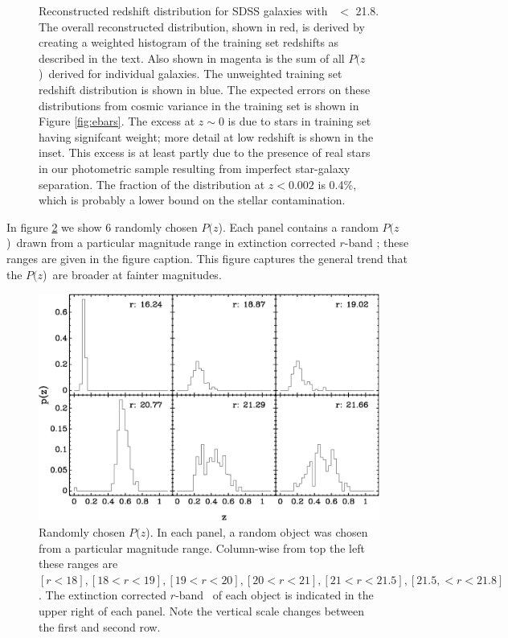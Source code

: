 \documentclass[preprint]{aastex}
\newcommand{\rmax}{21.8}
\newcommand{\pofz}{$P(z$)}
\begin{document}
\begin{figure}[p] \centering

    \caption{Reconstructed redshift distribution for SDSS galaxies with \rmag\
    $ < $ \rmax.  The overall reconstructed distribution, shown in red, is
    derived by creating a weighted histogram of the training set redshifts as
    described in the text.  Also shown in magenta is the sum of all \pofz\
    derived for individual galaxies.  The unweighted training set redshift
    distribution is shown in blue.  The expected errors on these distributions
    from cosmic variance in the training set is shown in Figure
    \ref{fig:ebars}. The excess at $z \sim 0$ is due to stars in training set
    having signifcant weight; more detail at low redshift is shown in the
    inset.  This excess is at least partly due to the presence of real stars in
    our photometric sample resulting from imperfect star-galaxy separation.
    The fraction of the distribution at $z < 0.002$ is 0.4\%, which is probably
    a lower bound on the stellar contamination.  \label{fig:pofz}}

    \vspace{2em}
\end{figure}

In figure \ref{fig:rand6pofz} we show 6 randomly chosen \pofz.  Each panel
contains a random \pofz\ drawn from a particular magnitude range in extinction
corrected $r$-band \cmodelmag; these ranges are given in the figure caption.
This figure captures the general trend that the \pofz\ are broader at
fainter magnitudes.

\begin{figure} [t]\centering
    \includegraphics[scale=0.7]{figures/11-6pofz.eps}
    \caption{Randomly chosen \pofz.  In each panel, a random object was
    chosen from a particular magnitude range.  Column-wise from top the
    left these ranges are $[r < 18], [18 < r < 19], [19 < r < 20], 
    [20 < r < 21], [21 < r < 21.5], [21.5, < r < 21.8]$.  
    The extinction corrected $r$-band \cmodelmag\ of each object
    is indicated in the upper right of each panel.  Note the
    vertical scale changes between the first and second row.
    \label{fig:rand6pofz}}
\end{figure}
\end{document}
